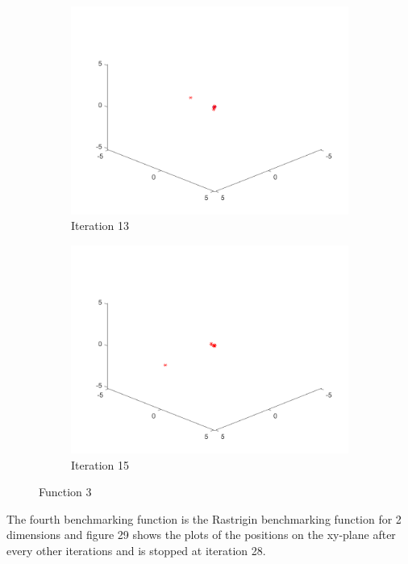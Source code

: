 \begin{figure}
\begin{subfigure}[b]{0.4\textwidth}
    \includegraphics[width=\textwidth]{img/smpl/fn4d/loa-iter-13}
    \caption{Iteration 13}
    \label{fig:s3-iter-6}
  \end{subfigure}
  \begin{subfigure}[b]{0.4\textwidth}
    \includegraphics[width=\textwidth]{img/smpl/fn4d/loa-iter-15}
    \caption{Iteration 15}
    \label{fig:s3-iter-7}
  \end{subfigure}
  \caption{Function 3}
\end{figure}

The fourth benchmarking function is the Rastrigin benchmarking function for 2 dimensions and figure 29 shows the plots of the positions on the xy-plane after every other iterations and is stopped at iteration 28.

